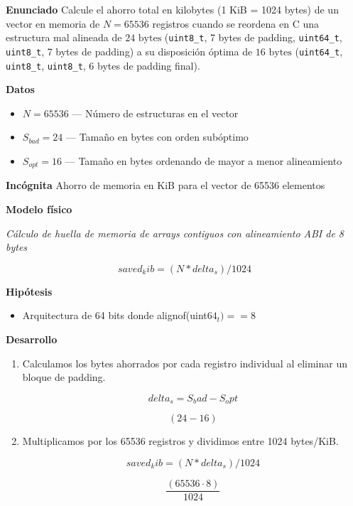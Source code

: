 \documentclass{book}
\begin{document}
\begin{tcolorbox}[title={Problema resuelto}, studiumworked, breakable]

\noindent\textbf{Enunciado}
Calcule el ahorro total en kilobytes (1 KiB = 1024 bytes) de un vector en memoria de \(N = 65536\) registros cuando se reordena en C una estructura mal alineada de \(24\text{ bytes}\) (\texttt{uint8\_t}, 7 bytes de padding, \texttt{uint64\_t}, \texttt{uint8\_t}, 7 bytes de padding) a su disposición óptima de \(16\text{ bytes}\) (\texttt{uint64\_t}, \texttt{uint8\_t}, \texttt{uint8\_t}, 6 bytes de padding final).

\noindent\textbf{Datos}
\begin{itemize}
\item $N = 65536$ — Número de estructuras en el vector
\item $S_{bad} = 24$ — Tamaño en bytes con orden subóptimo
\item $S_{opt} = 16$ — Tamaño en bytes ordenando de mayor a menor alineamiento
\end{itemize}

\noindent\textbf{Incógnita}
Ahorro de memoria en KiB para el vector de 65536 elementos

\noindent\textbf{Modelo físico}

\noindent\textit{Cálculo de huella de memoria de arrays contiguos con alineamiento ABI de 8 bytes}

\[
saved_kib = (N * delta_s) / 1024
\]

\noindent\textbf{Hipótesis}
\begin{itemize}
\item Arquitectura de 64 bits donde alignof(uint\(64_t) == 8\)
\end{itemize}

\noindent\textbf{Desarrollo}
\begin{enumerate}
\item
Calculamos los bytes ahorrados por cada registro individual al eliminar un bloque de padding.

\[
delta_s = S_bad - S_opt
\]

\[
\left(24-16\right)
\]
\item
Multiplicamos por los 65536 registros y dividimos entre 1024 bytes/KiB.

\[
saved_kib = (N * delta_s) / 1024
\]

\[
\frac{\left(65536\cdot 8\right)}{1024}
\]
\end{enumerate}


\end{tcolorbox}
\end{document}
